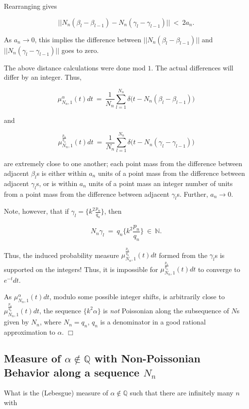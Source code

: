 \documentclass[12pt,letterpaper]{report}
\newcommand\be{\begin{equation}}
\newcommand\ee{\end{equation}}
\newcommand{\Q}{\mathbb{Q}}
\newcommand{\N}{\mathbb{N}}
\newcommand{\pn}{p_n}
\newcommand{\qn}{q_n}
\begin{document}
Rearranging gives

\be \Big|\Big|N_n(\beta_l - \beta_{l-1}) - N_n(\gamma_l -
\gamma_{l-1}) \Big|\Big| \ < \ 2a_n. \ee

As $a_n \to 0$, this implies the difference between
$\Big|\Big|N_n(\beta_l - \beta_{l-1})\Big|\Big|$ and $\Big|\Big|
N_n(\gamma_l - \gamma_{l-1}) \Big|\Big|$ goes to zero.

The above distance calculations were done mod $1$. The actual
differences will differ by an integer. Thus,

\be \mu_{N_n,1}^{\alpha}(t)dt \ = \ \frac{1}{N_n} \sum_{l=1}^{N_n}
\delta\Big(t - N_n(\beta_l - \beta_{l-1})\Big) \ee

and

\be \mu_{N_n,1}^{\frac{\pn}{\qn} }(t)dt \ = \ \frac{1}{N_n}
\sum_{l=1}^{N_n} \delta\Big(t - N_n(\gamma_l - \gamma_{l-1})\Big)
\ee

are extremely close to one another; each point mass from the
difference between adjacent $\beta_l$s is either within $a_n$
units of a point mass from the difference between adjacent
$\gamma_l$s, or is within $a_n$ units of a point mass an integer
number of units from a point mass from the difference between
adjacent $\gamma_l$s. Further, $a_n \to 0$.

Note, however, that if $\gamma_l = \{k^2 \frac{\pn}{\qn}\}$, then

\be N_n \gamma_l \ = \ q_n \Big\{k^2 \frac{\pn}{\qn} \Big\} \ \in
\ \N. \ee

Thus, the induced probability measure
$\mu_{N_n,1}^{\frac{\pn}{\qn}}(t)dt$ formed from the $\gamma_l$s
is supported on the integers! Thus, it is impossible for
$\mu_{N_n,1}^{\frac{\pn}{\qn}}(t)dt$ to converge to $e^{-t}dt$.

As $\mu_{N_n,1}^{\alpha}(t)dt$, modulo some possible integer
shifts, is arbitrarily close to
$\mu_{N_n,1}^{\frac{\pn}{\qn}}(t)dt$, the sequence $\{k^2
\alpha\}$ is \emph{not} Poissonian along the subsequence of $N$s
given by $N_n$, where $N_n = q_n$, $q_n$ is a denominator in a
good rational approximation to $\alpha$. $\Box$


\subsection{Measure of $\alpha \not\in \Q$ with Non-Poissonian
Behavior along a sequence $N_n$}

What is the (Lebesgue) measure of $\alpha \not\in \Q$ such that
there are infinitely many $n$ with
\end{document}
